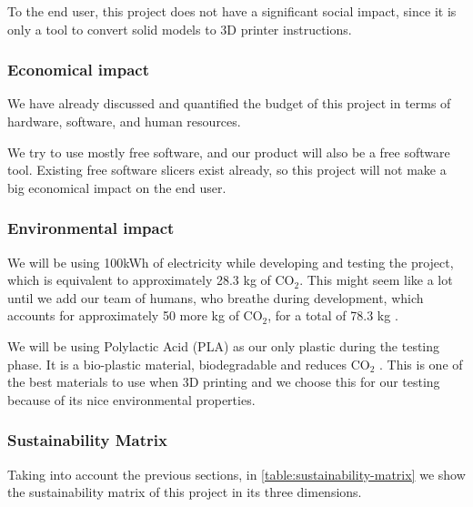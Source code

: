 To the end user, this project does not have a significant social impact, since it is only a tool to convert solid models to 3D printer instructions.


\subsubsection{Economical impact}
We have already discussed and quantified the budget of this project in terms of hardware, software, and human resources. 

We try to use mostly free software, and our product will also be a free software tool. Existing free software slicers exist already, so this project will not make a big economical impact on the end user.


\subsubsection{Environmental impact}
We will be using 100kWh of electricity while developing and testing the project, which is equivalent to approximately 28.3 kg of CO${_2}$. This might seem like a lot until we add our team of humans, who breathe during development, which accounts for approximately 50 more kg of CO${_2}$, for a total of 78.3 kg \cite{co2-breathing}.


We will be using Polylactic Acid (PLA) as our only plastic during the testing phase. It is a bio-plastic material, biodegradable and reduces CO$_{2}$ \cite{pla-co2, env-impact-3dp}. This is one of the best materials to use when 3D printing and we choose this for our testing because of its nice environmental properties.


\subsubsection{Sustainability Matrix}
Taking into account the previous sections, in \autoref{table:sustainability-matrix} we show the sustainability matrix of this project in its three dimensions.

